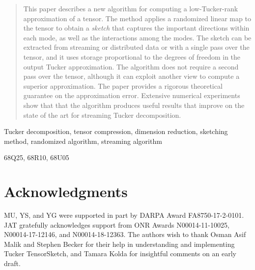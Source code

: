 \documentclass[review,onefignum,onetabnum]{siamart171218}
\begin{document}
\maketitle
\begin{abstract}
This paper describes a new algorithm for computing a low-Tucker-rank approximation of a tensor.
The method applies a randomized linear map to the tensor to obtain a \emph{sketch}
that captures the important directions within each mode, as well as the interactions among the modes.
The sketch can be extracted from streaming or distributed data or with a single pass over the tensor,
and it uses storage proportional to the degrees of freedom in the output Tucker approximation.
The algorithm does not require a second pass over the tensor, although it can exploit another view
to compute a superior approximation. The paper provides a rigorous theoretical guarantee
on the approximation error. Extensive numerical experiments show that that the algorithm
produces useful results that improve on the state of the art for streaming Tucker decomposition.
\end{abstract}

\begin{keywords}
Tucker decomposition, tensor compression, dimension reduction, sketching method, randomized algorithm, streaming algorithm
\end{keywords}

\begin{AMS}
  68Q25, 68R10, 68U05
\end{AMS}





% 
\section*{Acknowledgments}
MU, YS, and YG were supported in part by DARPA Award FA8750-17-2-0101.
JAT gratefully acknowledges support from ONR Awards N00014-11-10025, N00014-17-12146, and N00014-18-12363.
The authors wish to thank Osman Asif Malik and Stephen Becker for their help
in understanding and implementing Tucker TensorSketch,
and Tamara Kolda for insightful comments on an early draft.




\appendix
\begin{appendices}
\onecolumn





\end{appendices}
\end{document}
